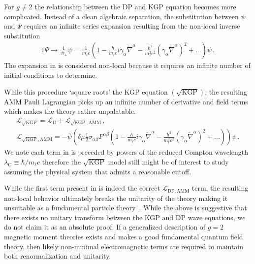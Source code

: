 For $g\!\neq\!2$ the relationship between the DP and KGP equation becomes more complicated. Instead of a clean algebraic separation, the substitution between $\psi$ and $\Psi$ requires an infinite series expansion resulting from the non-local inverse substitution 
\begin{alignat}{1}
	\label{nonlocal:1} \Psi\rightarrow\frac{1}{\mathcal{D}_{+}}\psi = \frac{1}{m_{\ell}c}\left(1 - \frac{\hbar}{m_{\ell}c}i\gamma_{\alpha}\widetilde\nabla^{\alpha} - \frac{\hbar^{2}}{m_{\ell}^{2}c^{2}}\left(\gamma_{\alpha}\widetilde\nabla^{\alpha}\right)^{2} + \ldots\right)\psi\,.
\end{alignat}
The expansion in  is considered non-local because it requires an infinite number of initial conditions to determine.

While this procedure `square roots' the KGP equation $(\mathrm{\sqrt{KGP}})$, the resulting AMM Pauli Lagrangian  picks up an infinite number of derivative and field terms which makes the theory rather unpalatable.
\begin{gather}
    \label{lamm:2}
    \mathcal{L}_{\sqrt{\mathrm{KGP}}} = \mathcal{L}_\mathrm{D}+\mathcal{L}_\mathrm{\sqrt{KGP},AMM}\,,\\
    \label{lamm:3}
    \mathcal{L}_\mathrm{\sqrt{KGP},AMM} = -{\bar\psi}\left(\delta\mu\frac{1}{2}\sigma_{\alpha\beta}F^{\alpha\beta}\left(1 - \frac{\hbar}{m_{\ell}c}i\gamma_{\alpha}\widetilde\nabla^{\alpha} - \frac{\hbar^{2}}{m_{\ell}^{2}c^{2}}\left(\gamma_{\alpha}\widetilde\nabla^{\alpha}\right)^{2} + \ldots\right)\right)\psi\,.
\end{gather}
We note each term in  is preceded by powers of the reduced Compton wavelength $\lambda_\mathrm{C}\!\equiv\!\hbar/m_{\ell}c$ therefore the $\sqrt{\mathrm{KGP}}$ model still might be of interest to study assuming the physical system that admits a reasonable cutoff.

While the first term present in  is indeed the correct $\mathcal{L}_\mathrm{DP,AMM}$ term, the resulting non-local behavior ultimately breaks the unitarity of the theory making it unsuitable as a fundamental particle theory~\citep{Veltman:1997am}. While the above is suggestive that there exists no unitary transform between the KGP and DP wave equations, we do not claim it as an absolute proof. If a generalized description of $g\!=\!2$ magnetic moment theories exists and makes a good fundamental quantum field theory, then likely non-minimal electromagnetic terms are required to maintain both renormalization and unitarity.

